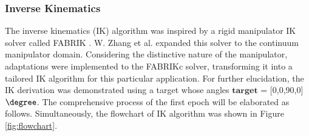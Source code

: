 \subsubsection{Inverse Kinematics}
The inverse kinematics (IK) algorithm was inspired by a rigid manipulator IK solver called FABRIK 
\cite{fabrik}. W. Zhang et al.\cite{fabrikc} expanded this solver to the continuum manipulator domain. Considering 
the distinctive nature of the manipulator, adaptations were implemented to the FABRIKc solver, transforming it 
into a tailored IK algorithm for this particular application. For further elucidation, the IK derivation was 
demonstrated using a target whose angles $\boldsymbol{target}$ = [0,0,90,0] $\degree$. The comprehensive process 
of the first epoch will be elaborated as follows. Simultaneously, the flowchart of IK algorithm was shown in 
Figure \ref{fig:flowchart}.  \\
\vspace{-5mm}

